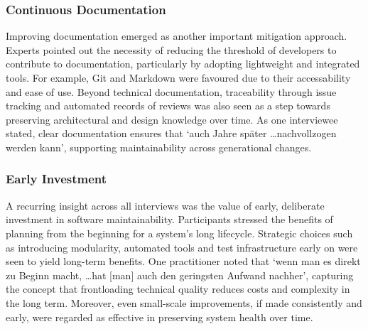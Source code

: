 \subsubsection{Continuous Documentation}
Improving documentation emerged as another important mitigation approach. Experts pointed out the necessity of reducing the threshold of developers to contribute to documentation, particularly by adopting lightweight and integrated tools. For example, Git and Markdown were favoured due to their accessability and ease of use.
Beyond technical documentation, traceability through issue tracking and automated records of reviews was also seen as a step towards preserving architectural and design knowledge over time. As one interviewee stated, clear documentation ensures that `auch Jahre später \ldots nachvollzogen werden kann', supporting maintainability across generational changes.\\

\subsubsection{Early Investment}
A recurring insight across all interviews was the value of early, deliberate investment in software maintainability. Participants stressed the benefits of planning from the beginning for a system's long lifecycle. Strategic choices such as introducing modularity, automated tools and test infrastructure early on were seen to yield long-term benefits.
One practitioner noted that `wenn man es direkt zu Beginn macht, \ldots hat [man] auch den geringsten Aufwand nachher', capturing the concept that frontloading technical quality reduces costs and complexity in the long term. Moreover, even small-scale improvements, if made consistently and early, were regarded as effective in preserving system health over time.\\

